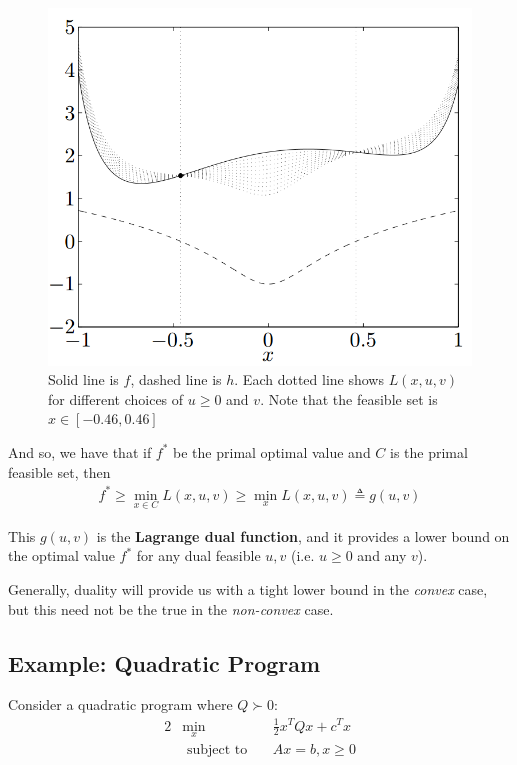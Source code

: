 \documentclass[11pt]{article}
\begin{document}
\begin{figure}[h]
  \centering
  \includegraphics[scale=0.3]{lagrangian.png}
  \caption{Solid line is $f$, dashed line is $h$. Each dotted line shows $L(x,u,v)$ for different choices of $u \geq 0$ and $v$. Note that the feasible set is $x \in [-0.46, 0.46]$}
  \label{fig:lagrangian}
\end{figure}

And so, we have that if $f^*$ be the primal optimal value and $C$ is the primal
feasible set, then
\begin{align*}
f^* \geq \min_{x \in C} L(x, u, v) \geq \min_x L(x, u, v) \triangleq g(u, v)
\end{align*}

This $g(u, v)$ is the \textbf{Lagrange dual function}, and it provides a lower
bound on the optimal value $f^*$ for any dual feasible $u, v$ (i.e. $u \geq 0$
and any $v$).

Generally, duality will provide us with a tight lower bound in the
\textit{convex} case, but this need not be the true in the \textit{non-convex} case.

\subsection{Example: Quadratic Program}
Consider a quadratic program where $Q \succ 0$:
\begin{alignat*}{2}
&\min_x& &\frac{1}{2} x^T Q x + c^T x \\
&\text{ subject to}&~&Ax = b, x \geq 0
\end{alignat*}
\end{document}

